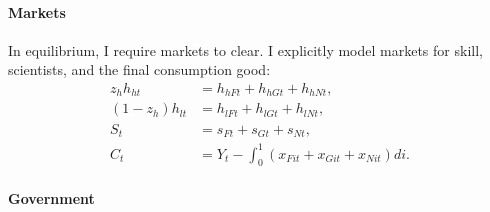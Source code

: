 \paragraph{Markets}
In equilibrium, I require markets to clear. I explicitly model markets for skill, scientists, and the final consumption good:
\begin{align*}
z_h h_{ht}&=h_{hFt}+h_{hGt}+h_{hNt},\\
(1-z_h) h_{lt}&=h_{lFt}+h_{lGt}+h_{lNt},\\
S_t&=s_{Ft}+s_{Gt}+s_{Nt},\\
C_t&=Y_t-\int_{0}^{1}\left(x_{Fit}+x_{Git}+x_{Nit}\right)di.  %
\end{align*}

\paragraph{Government}

